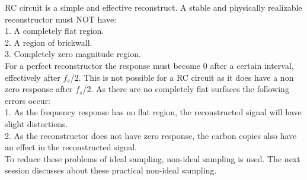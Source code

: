 RC circuit is a simple and effective reconstruct.
A stable and physically realizable reconstructor must NOT have:\\
1. A completely flat region.\\
2. A region of brickwall.\\
3. Completely zero magnitude region.\\

For a perfect reconstructor the response must become 0 after a certain interval, effectively after $f_s$/2. This is not possible for a RC circuit as it does have a non zero response after $f_s$/2.
As there are no completely flat surfaces the following errors occur:\\
1. As the frequency response has no flat region, the reconstructed signal will have slight distortions.\\
2. As the reconstructor does not have zero response, the carbon copies also have an effect in the reconstructed signal.\\

To reduce these problems of ideal sampling, non-ideal sampling is used. The next session discusses about these practical non-ideal sampling.

